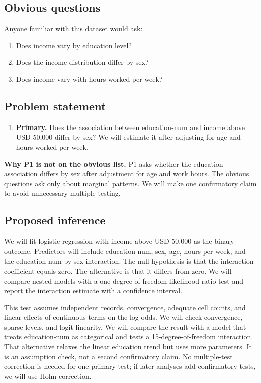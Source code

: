 \documentclass[11pt,a4paper]{article}
\newcommand{\code}[1]{{\small\ttfamily #1}}
\begin{document}
\subsection{Obvious questions}

Anyone familiar with this dataset would ask:
\begin{enumerate}[label=\textbf{O\arabic*.},leftmargin=2.4em]
  \item Does income vary by education level?
  \item Does the income distribution differ by sex?
  \item Does income vary with hours worked per week?
\end{enumerate}

\subsection{Problem statement}

\begin{enumerate}[label=\textbf{P\arabic*.},leftmargin=2.4em]
  \item \textbf{Primary.} Does the association between \code{education-num} and income above USD 50,000 differ by sex? We will estimate it after adjusting for age and hours worked per week.
\end{enumerate}

\textbf{Why P1 is not on the obvious list.} P1 asks whether the education association differs by sex after adjustment for age and work hours. The obvious questions ask only about marginal patterns. We will make one confirmatory claim to avoid unnecessary multiple testing.

\subsection{Proposed inference}

We will fit logistic regression with income above USD 50,000 as the binary
outcome. Predictors will include education-num, sex, age, hours-per-week, and
the education-num-by-sex interaction. The null hypothesis is that the
interaction coefficient equals zero. The alternative is that it differs from
zero. We will compare nested models with a one-degree-of-freedom likelihood
ratio test and report the interaction estimate with a confidence interval.

This test assumes independent records, convergence, adequate cell counts, and
linear effects of continuous terms on the log-odds. We will check convergence,
sparse levels, and logit linearity. We will compare the result with a model
that treats education-num as categorical and tests a 15-degree-of-freedom
interaction. That alternative relaxes the linear education trend but uses more
parameters. It is an assumption check, not a second confirmatory claim. No
multiple-test correction is needed for one primary test; if later analyses add
confirmatory tests, we will use Holm correction.
\end{document}
